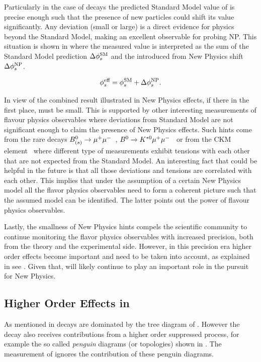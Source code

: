 Particularly in the case of \BsJpsiPhi decays the predicted Standard Model value of  is precise enough
such that the presence of new particles could shift its value ~\cite{Buras:2009if,Chiang:2009ev,Datta:2009fk} significantly.
Any deviation (small or large) is a direct evidence for physics beyond the Standard Model, making \phis an excellent observable for probing NP.
This situation is shown in  where the measured value  is interpreted
as the sum of the Standard Model prediction $\Delta\phi_{s}^{\tiny\text {SM}}$ and the introduced from New Physics shift $\Delta\phi_{s}^{\tiny\text {NP}}$.

\begin{equation}
  \centering
 \phis^{\text {eff}} = \phis^{\tiny \text{SM}} + \Delta\phiS{NP}.
 \label{phis_meas}
\end{equation}

In view of the combined \phis result illustrated in  New Physics effects, if there in the first place, must be small.
This is supported by other interesting measurements of flavour physics observables where deviations from Standard Model are not significant enough
to claim the presence of New Physics effects. Such hints come from the rare decays $B^0_{(s)}\rightarrow \mu^+\mu^-$~\cite{CMS:2014xfa}, $B^0\rightarrow K^{*0}\mu^+\mu^-$~\cite{Aaij:2015oid}
or from the \Vub CKM element~\cite{Aaij:2015bfa} where different type of measurements exhibit tensions with each other that are not expected from the Standard Model.
An interesting fact that could be helpful in the future is that all those deviations and tensions are
correlated with each other. This implies that under the assumption of a certain New Physics model all the flavor physics
observables need to form a coherent picture such that the assumed model can be identified.
The latter points out the power of flavour physics observables.

Lastly, the smallness of New Physics hints compels the scientific community to continue monitoring  the
flavor physics observables with increased precision, both from the theory and the experimental side.
However, in this precision era higher order effects become important and need to be taken into account,
as explained in see . Given that, \phis will likely continue to play an important
role in the pursuit for New Physics.

\subsection{Higher Order Effects in \phis}
\label{TheBsJpsiKstDecay}
As mentioned in  \BsJpsiPhi decays are dominated by the tree diagram of .
However the decay also receives contributions from a higher order suppressed process, for example the so called
{\it penguin} diagrams (or topologies) shown in . The \phis measurement of 
ignores the contribution of these penguin diagrams.

